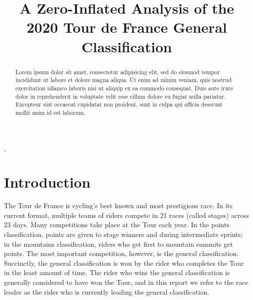 \documentclass[aos,preprint]{imsart}
\begin{document}
\begin{frontmatter}
\title{A Zero-Inflated Analysis of the 2020 Tour de France General Classification}

\begin{aug}
\author{ },

\runauthor{}


\address{Department of Statistics\\
University of British Columbia\\
Vancouver, BC, Canada V6T 1Z4\\
E-mail: \normalfont
\href{mailto:gian.diluvi@stat.ubc.ca}{gian.diluvi@stat.ubc.ca},}

\end{aug}

\begin{abstract}
Lorem ipsum dolor sit amet, consectetur adipisicing elit, sed do eiusmod tempor incididunt ut labore et dolore magna aliqua. Ut enim ad minim veniam, quis nostrud exercitation ullamco laboris nisi ut aliquip ex ea commodo consequat. Duis aute irure dolor in reprehenderit in voluptate velit esse cillum dolore eu fugiat nulla pariatur. Excepteur sint occaecat cupidatat non proident, sunt in culpa qui officia deserunt mollit anim id est laborum.
\end{abstract}


\end{frontmatter}

\section{Introduction} \label{sec:intro}


The Tour de France is cycling's best known and most prestigious race. In its current format, multiple teams of riders compete in 21 races (called stages) across 23 days. Many competitions take place at the Tour each year. In the points classification, points are given to stage winners and during intermediate sprints; in the mountains classification, riders who get first to mountain summits get points. The most important competition, however, is the general classification. Succinctly, the general classification is won by the rider who completes the Tour in the least amount of time. The rider who wins the general classification is generally considered to have won the Tour, and in this report we refer to the race leader as the rider who is currently leading the general classification. \\
\end{document}
